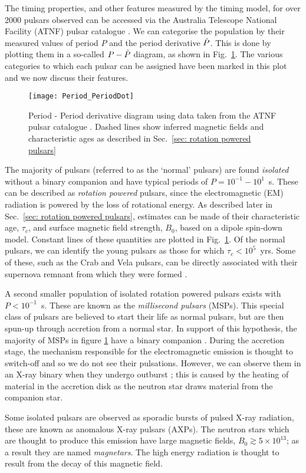 The timing properties, and other features measured by the timing model, for
over 2000 pulsars observed can be accessed via the Australia Telescope National
Facility (ATNF) pulsar catalogue \citep{ATNF}.  We can categorise the
population by their measured values of period $P$ and the period derivative
$\dot{P}$. This is done by plotting them in a so-called $P - \dot{P}$ diagram, as
shown in Fig.~\ref{fig: Period_PeriodDot}.  The various categories to which
each pulsar can be assigned have been marked in this plot and we now discuss
their features.

\begin{figure}[htb]
    \centering
    \texttt{[image: Period\_PeriodDot]}
    \caption{Period - Period derivative diagram using data taken from the ATNF pulsar
             catalogue \citep{ATNF}. Dashed lines show inferred magnetic fields
             and characteristic ages as described in Sec.~\ref{sec: rotation
             powered pulsars}}
    \label{fig: Period_PeriodDot}
\end{figure}

The majority of pulsars (referred to as the `normal' pulsars) are found
\emph{isolated} without a binary companion and have typical periods of
$P=10^{-1}-10^{1}$~s. These can be described as \emph{rotation powered} pulsars,
since the electromagnetic (EM) radiation is powered by the loss of rotational energy. As
described later in Sec.~\ref{sec: rotation powered pulsars}, estimates can be made
of their characteristic age, $\tau_{c}$, and surface magnetic field strength,
$B_{0}$, based on a dipole spin-down model. Constant lines of these quantities
are plotted in Fig.~\ref{fig: Period_PeriodDot}. Of the normal pulsars, we
can identify the young pulsars as those for which $\tau_{c}<10^{5}$~yrs. Some
of these, such as the Crab and Vela pulsars, can be directly associated with their
supernova remnant from which they were formed \citep{Kaspi1996}.

A second smaller population of isolated rotation powered pulsars exists with
$P<10^{-1}$~s. These are known as the \emph{millisecond pulsars} (MSPs). This special
class of pulsars are believed to start their life as normal pulsars, but are then
spun-up through accretion from a normal star. In support of this hypothesis,
the majority of MSPs in figure \ref{fig: Period_PeriodDot} have a binary
companion \citep{wijnands1998millisecond}.  During the accretion stage, the
mechanism responsible for the electromagnetic emission is thought to switch-off
and so we do not see their pulsations. However, we can observe them in an X-ray
binary when they undergo outburst \citep{lewin1997x}; this is caused by the
heating of material in the accretion disk as the neutron star draws material
from the companion star.

Some isolated pulsars are observed as sporadic bursts of pulsed X-ray radiation,
these are known as anomalous X-ray pulsars (AXPs). The neutron stars which are
thought to produce this emission have large magnetic fields, $B_{0}\gtrsim
5\times10^{13}$; as a result they are named \emph{magnetars}. The high energy
radiation is thought to result from the decay of this magnetic field.
